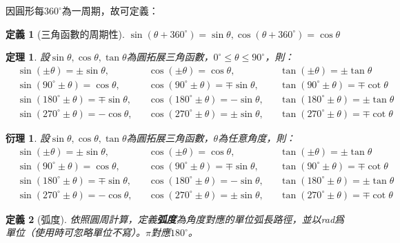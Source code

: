 \documentclass[12pt]{article}
\newtheorem{definition}{定義}
\newtheorem*{theorem}{定理}
\newtheorem*{corollary}{衍理}
\begin{document}
    因圓形每$360^\circ$為一周期，故可定義：

    \begin{definition}[三角函數的周期性]
        $\sin(\theta+360^\circ)=\sin{\theta},\cos(\theta+360^\circ)=\cos{\theta}$
    \end{definition}

    \begin{theorem}
        設$\sin{\theta},\cos{\theta},\tan{\theta}$為圓拓展三角函數，$0^\circ\leq \theta\leq 90^\circ$，則：\begin{align*}
            &\sin(\pm\theta)=\pm\sin{\theta},&&\cos(\pm\theta)=\cos{\theta},&&\tan(\pm\theta)=\pm\tan{\theta}\\
            &\sin(90^\circ\pm\theta)=\cos{\theta},&&\cos(90^\circ\pm\theta)=\mp\sin{\theta},&&\tan(90^\circ\pm\theta)=\mp\cot{\theta}\\
            &\sin(180^\circ\pm\theta)=\mp\sin{\theta},&&\cos(180^\circ\pm\theta)=-\sin{\theta},&&\tan(180^\circ\pm\theta)=\pm\tan{\theta}\\
            &\sin(270^\circ\pm\theta)=-\cos{\theta},&&\cos(270^\circ\pm\theta)=\pm\sin{\theta},&&\tan(270^\circ\pm\theta)=\mp\cot{\theta}
        \end{align*}
    \end{theorem}

    \begin{corollary}
        設$\sin{\theta},\cos{\theta},\tan{\theta}$為圓拓展三角函數，$\theta$為任意角度，則：\begin{align*}
            &\sin(\pm\theta)=\pm\sin{\theta},&&\cos(\pm\theta)=\cos{\theta},&&\tan(\pm\theta)=\pm\tan{\theta}\\
            &\sin(90^\circ\pm\theta)=\cos{\theta},&&\cos(90^\circ\pm\theta)=\mp\sin{\theta},&&\tan(90^\circ\pm\theta)=\mp\cot{\theta}\\
            &\sin(180^\circ\pm\theta)=\mp\sin{\theta},&&\cos(180^\circ\pm\theta)=-\sin{\theta},&&\tan(180^\circ\pm\theta)=\pm\tan{\theta}\\
            &\sin(270^\circ\pm\theta)=-\cos{\theta},&&\cos(270^\circ\pm\theta)=\pm\sin{\theta},&&\tan(270^\circ\pm\theta)=\mp\cot{\theta}
        \end{align*}
    \end{corollary}

    \begin{definition}[弧度]
        依照圓周計算，定義\textbf{弧度}為角度對應的單位弧長路徑，並以rad爲單位（使用時可忽略單位不寫）。$\pi$對應$180^\circ$。
    \end{definition}
\end{document}
